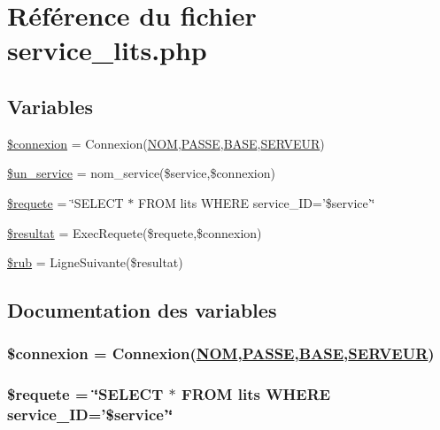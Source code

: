 \hypertarget{service__lits_8php}{
\section{R\'{e}f\'{e}rence du fichier service\_\-lits.php}
\label{service__lits_8php}
}
\subsection*{Variables}
\begin{CompactItemize}
\item 
\hyperlink{service__lits_8php_a0}{\$connexion} = Connexion(\hyperlink{pma__connect_8php_a0}{NOM},\hyperlink{pma__connect_8php_a1}{PASSE},\hyperlink{pma__connect_8php_a3}{BASE},\hyperlink{pma__connect_8php_a2}{SERVEUR})
\item 
\hyperlink{service__lits_8php_a1}{\$un\_\-service} = nom\_\-service(\$service,\$connexion)
\item 
\hyperlink{service__lits_8php_a2}{\$requete} = \char`\"{}SELECT $\ast$ FROM lits WHERE service\_\-ID='\$service'\char`\"{}
\item 
\hyperlink{service__lits_8php_a3}{\$resultat} = Exec\-Requete(\$requete,\$connexion)
\item 
\hyperlink{service__lits_8php_a4}{\$rub} = Ligne\-Suivante(\$resultat)
\end{CompactItemize}


\subsection{Documentation des variables}
\hypertarget{service__lits_8php_a0}{
\subsubsection[\$connexion]{\setlength{\rightskip}{0pt plus 5cm}\$connexion = Connexion(\hyperlink{pma__connect_8php_a0}{NOM},\hyperlink{pma__connect_8php_a1}{PASSE},\hyperlink{pma__connect_8php_a3}{BASE},\hyperlink{pma__connect_8php_a2}{SERVEUR})}}
\label{service__lits_8php_a0}


\hypertarget{service__lits_8php_a2}{
\subsubsection[\$requete]{\setlength{\rightskip}{0pt plus 5cm}\$requete = \char`\"{}SELECT $\ast$ FROM lits WHERE service\_\-ID='\$service'\char`\"{}}}
\label{service__lits_8php_a2}


